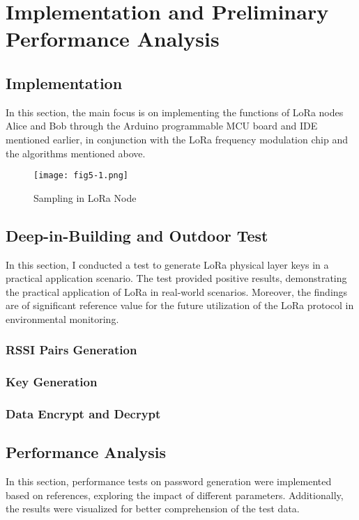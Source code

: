 
\chapter{Implementation and Preliminary Performance Analysis}

\section{Implementation}
In this section, the main focus is on implementing the functions of LoRa nodes Alice and Bob through the Arduino programmable MCU board and IDE mentioned earlier, in conjunction with the LoRa frequency modulation chip and the algorithms mentioned above.

\begin{figure}
    \centering
    \texttt{[image: fig5-1.png]}
    \caption{Sampling in LoRa Node}
    \label{fig:5-1}
  \end{figure}

\section{Deep-in-Building and Outdoor Test}
In this section, I conducted a test to generate LoRa physical layer keys in a practical application scenario. The test provided positive results, demonstrating the practical application of LoRa in real-world scenarios. Moreover, the findings are of significant reference value for the future utilization of the LoRa protocol in environmental monitoring.

\subsection{RSSI Pairs Generation}

\subsection{Key Generation}

\subsection{Data Encrypt and Decrypt}

\section{Performance Analysis}
In this section, performance tests on password generation were implemented based on references, exploring the impact of different parameters. Additionally, the results were visualized for better comprehension of the test data.
